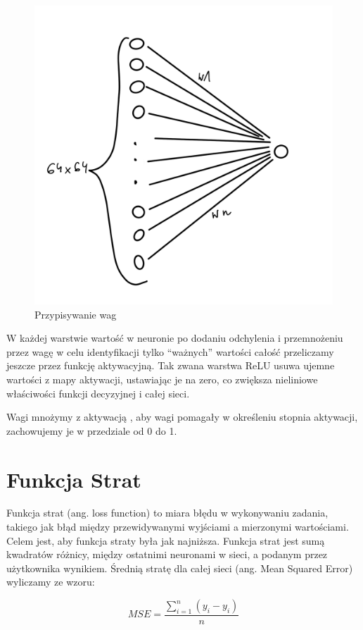 \documentclass[brudnopis]{xmgr}
\begin{document}
\begin{figure}[!tbh]
\centering
\includegraphics[width=.8\hsize]{fig/3}
\caption{Przypisywanie wag\label{RYS.3}}
\end{figure}



W każdej warstwie  wartość w neuronie po dodaniu odchylenia i przemnożeniu przez wagę w celu identyfikacji tylko “ważnych” wartości całość przeliczamy jeszcze przez funkcję aktywacyjną. 
Tak zwana warstwa ReLU usuwa ujemne wartości z mapy aktywacji, ustawiając je na zero, co zwiększa nieliniowe właściwości funkcji decyzyjnej i całej sieci.


 Wagi mnożymy z aktywacją ,  aby wagi pomagały w określeniu stopnia aktywacji, zachowujemy je w przedziale od 0 do 1.
 
 \section{Funkcja Strat \label{s:dsssl}}
 
Funkcja strat (ang. loss function) to miara błędu w wykonywaniu zadania, takiego jak błąd między przewidywanymi wyjściami a mierzonymi wartościami. Celem jest, aby funkcja straty była jak najniższa. 
Funkcja strat jest sumą kwadratów różnicy, między ostatnimi neuronami w sieci, a podanym przez użytkownika wynikiem. Średnią stratę dla całej sieci (ang. Mean Squared Error) wyliczamy ze wzoru:  

$$MSE=\frac{\sum_{i=1}^{n} (y_i - y_i)}{n}$$
\end{document}

